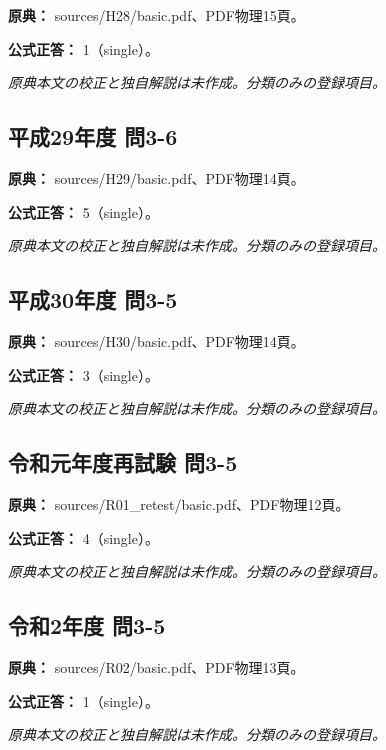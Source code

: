 \noindent\textbf{原典：} sources/H28/basic.pdf、PDF物理15頁。

\textbf{公式正答：} 1（single）。

\par\textit{原典本文の校正と独自解説は未作成。分類のみの登録項目。}

\subsection{平成29年度 問3-6}
\label{q:h29-reg-basic-3-6}

\noindent\textbf{原典：} sources/H29/basic.pdf、PDF物理14頁。

\textbf{公式正答：} 5（single）。

\par\textit{原典本文の校正と独自解説は未作成。分類のみの登録項目。}

\subsection{平成30年度 問3-5}
\label{q:h30-reg-basic-3-5}

\noindent\textbf{原典：} sources/H30/basic.pdf、PDF物理14頁。

\textbf{公式正答：} 3（single）。

\par\textit{原典本文の校正と独自解説は未作成。分類のみの登録項目。}

\subsection{令和元年度再試験 問3-5}
\label{q:r01-ret-basic-3-5}

\noindent\textbf{原典：} sources/R01\_retest/basic.pdf、PDF物理12頁。

\textbf{公式正答：} 4（single）。

\par\textit{原典本文の校正と独自解説は未作成。分類のみの登録項目。}

\subsection{令和2年度 問3-5}
\label{q:r02-reg-basic-3-5}

\noindent\textbf{原典：} sources/R02/basic.pdf、PDF物理13頁。

\textbf{公式正答：} 1（single）。

\par\textit{原典本文の校正と独自解説は未作成。分類のみの登録項目。}

